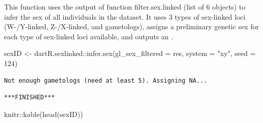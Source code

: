 \documentclass[
  letterpaper,
  DIV=11,
  numbers=noendperiod]{scrreprt}
\newenvironment{Shaded}{\begin{snugshade}}{\end{snugshade}}
\newcommand{\AttributeTok}[1]{\textcolor[rgb]{0.49,0.56,0.16}{#1}}
\newcommand{\DecValTok}[1]{\textcolor[rgb]{0.25,0.63,0.44}{#1}}
\newcommand{\FunctionTok}[1]{\textcolor[rgb]{0.02,0.16,0.49}{#1}}
\newcommand{\NormalTok}[1]{\textcolor[rgb]{0.00,0.44,0.13}{#1}}
\newcommand{\OtherTok}[1]{\textcolor[rgb]{0.00,0.44,0.13}{#1}}
\newcommand{\SpecialCharTok}[1]{\textcolor[rgb]{0.25,0.44,0.63}{#1}}
\newcommand{\StringTok}[1]{\textcolor[rgb]{0.25,0.44,0.63}{#1}}
\let\textttOrig\texttt
\renewcommand{\texttt}[1]{\textttOrig{\color{blue}{#1}}}
\begin{document}
This function uses the output of function filter.sex.linked (list of 6
objects) to infer the sex of all individuals in the dataset. It uses 3
types of sex-linked loci (W-/Y-linked, Z-/X-linked, and gametologs),
assigns a preliminary genetic sex for each type of sex-linked loci
available, and outputs an \texttt{agreed\ sex}.

\begin{Shaded}
\begin{Highlighting}[]
\NormalTok{sexID }\OtherTok{\textless{}{-}}\NormalTok{ dartR.sexlinked}\SpecialCharTok{::}\FunctionTok{infer.sex}\NormalTok{(}\AttributeTok{gl\_sex\_filtered =}\NormalTok{ res, }\AttributeTok{system =} \StringTok{"xy"}\NormalTok{,}
    \AttributeTok{seed =} \DecValTok{124}\NormalTok{)}
\end{Highlighting}
\end{Shaded}

\begin{verbatim}
Not enough gametologs (need at least 5). Assigning NA...
\end{verbatim}

\begin{verbatim}
***FINISHED***
\end{verbatim}

\begin{Shaded}
\begin{Highlighting}[]
\NormalTok{knitr}\SpecialCharTok{::}\FunctionTok{kable}\NormalTok{(}\FunctionTok{head}\NormalTok{(sexID))}
\end{Highlighting}
\end{Shaded}
\end{document}

